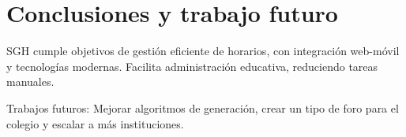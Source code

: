 \section{Conclusiones y trabajo futuro}
SGH cumple objetivos de gestión eficiente de horarios, con integración web-móvil y tecnologías modernas. Facilita administración educativa, reduciendo tareas manuales.

Trabajos futuros: Mejorar algoritmos de generación, crear un tipo de foro para el colegio y escalar a más instituciones.